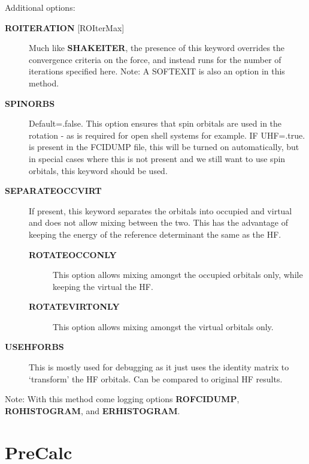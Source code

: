 \documentclass[openany,a4paper,10pt,english]{manual}
\begin{document}
Additional options:
\begin{description}
\item[\textbf{ROITERATION} {[}ROIterMax{]}] \leavevmode
Much like \textbf{SHAKEITER}, the presence of this keyword overrides the convergence criteria
on the force, and instead runs for the number of iterations specified here.
Note: A SOFTEXIT is also an option in this method.

\item[\textbf{SPINORBS}] \leavevmode
Default=.false.
This option ensures that spin orbitals are used in the rotation - as is required for open shell
systems for example.
IF UHF=.true. is present in the FCIDUMP file, this will be turned on automatically, but in special
cases where this is not present and we still want to use spin orbitals, this keyword should be used.

\item[\textbf{SEPARATEOCCVIRT}] \leavevmode
If present, this keyword separates the orbitals into occupied and virtual and does not
allow mixing between the two.
This has the advantage of keeping the energy of the reference determinant the same as the HF.
\begin{description}
\item[\textbf{ROTATEOCCONLY}] \leavevmode
This option allows mixing amongst the occupied orbitals only, while keeping the virtual
the HF.

\item[\textbf{ROTATEVIRTONLY}] \leavevmode
This option allows mixing amongst the virtual orbitals only.

\end{description}

\item[\textbf{USEHFORBS}] \leavevmode
This is mostly used for debugging as it just uses the identity matrix to `transform' the HF orbitals.
Can be compared to original HF results.

\end{description}

Note: With this method come logging options \textbf{ROFCIDUMP}, \textbf{ROHISTOGRAM}, and \textbf{ERHISTOGRAM}.

\resetcurrentobjects
\hypertarget{--doc-input/precalc}{}

\hypertarget{input-precalc}{}\section{PreCalc}
\end{document}
